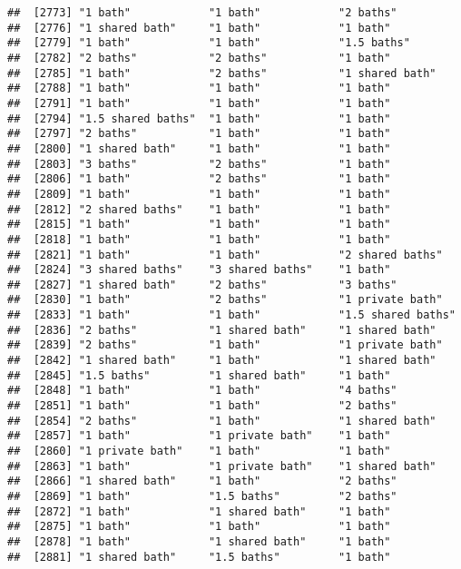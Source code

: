 \documentclass[
]{article}
\begin{document}
\begin{verbatim}
##  [2773] "1 bath"            "1 bath"            "2 baths"          
##  [2776] "1 shared bath"     "1 bath"            "1 bath"           
##  [2779] "1 bath"            "1 bath"            "1.5 baths"        
##  [2782] "2 baths"           "2 baths"           "1 bath"           
##  [2785] "1 bath"            "2 baths"           "1 shared bath"    
##  [2788] "1 bath"            "1 bath"            "1 bath"           
##  [2791] "1 bath"            "1 bath"            "1 bath"           
##  [2794] "1.5 shared baths"  "1 bath"            "1 bath"           
##  [2797] "2 baths"           "1 bath"            "1 bath"           
##  [2800] "1 shared bath"     "1 bath"            "1 bath"           
##  [2803] "3 baths"           "2 baths"           "1 bath"           
##  [2806] "1 bath"            "2 baths"           "1 bath"           
##  [2809] "1 bath"            "1 bath"            "1 bath"           
##  [2812] "2 shared baths"    "1 bath"            "1 bath"           
##  [2815] "1 bath"            "1 bath"            "1 bath"           
##  [2818] "1 bath"            "1 bath"            "1 bath"           
##  [2821] "1 bath"            "1 bath"            "2 shared baths"   
##  [2824] "3 shared baths"    "3 shared baths"    "1 bath"           
##  [2827] "1 shared bath"     "2 baths"           "3 baths"          
##  [2830] "1 bath"            "2 baths"           "1 private bath"   
##  [2833] "1 bath"            "1 bath"            "1.5 shared baths" 
##  [2836] "2 baths"           "1 shared bath"     "1 shared bath"    
##  [2839] "2 baths"           "1 bath"            "1 private bath"   
##  [2842] "1 shared bath"     "1 bath"            "1 shared bath"    
##  [2845] "1.5 baths"         "1 shared bath"     "1 bath"           
##  [2848] "1 bath"            "1 bath"            "4 baths"          
##  [2851] "1 bath"            "1 bath"            "2 baths"          
##  [2854] "2 baths"           "1 bath"            "1 shared bath"    
##  [2857] "1 bath"            "1 private bath"    "1 bath"           
##  [2860] "1 private bath"    "1 bath"            "1 bath"           
##  [2863] "1 bath"            "1 private bath"    "1 shared bath"    
##  [2866] "1 shared bath"     "1 bath"            "2 baths"          
##  [2869] "1 bath"            "1.5 baths"         "2 baths"          
##  [2872] "1 bath"            "1 shared bath"     "1 bath"           
##  [2875] "1 bath"            "1 bath"            "1 bath"           
##  [2878] "1 bath"            "1 shared bath"     "1 bath"           
##  [2881] "1 shared bath"     "1.5 baths"         "1 bath"           

\end{verbatim}
\end{document}
